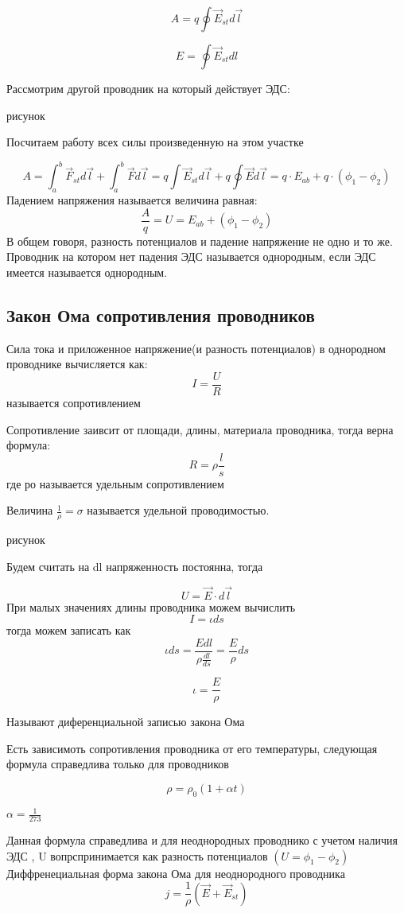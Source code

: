 \documentclass[../main.tex]{subfiles}
\begin{document}
\[A = q \oint \vec E_{st} d \vec l\]

\[E = \oint \vec E_{st} dl\]

Рассмотрим другой проводник на который действует ЭДС:

рисунок

Посчитаем работу всех силы произведенную на этом участке

\[A = \int_{a}^{b} \vec F_{st} d \vec l + \int_{a}^{b} \vec F d \vec l = q \int \vec E_{st} d \vec l + q \oint \vec E d \vec l = q \cdot E_{ab} + q \cdot (\phi_1 - \phi_2)\]
 Падением напряжения называется величина равная:
\[\frac{A}{q} = U = E_{ab} + (\phi_1 - \phi_2)\]
В общем говоря, разность потенциалов и падение напряжение не одно и то же.
Проводник на котором нет падения ЭДС называется однородным, если ЭДС имеется называется однородным.

\subsection{Закон Ома сопротивления проводников}

Сила тока и приложенное напряжение(и разность потенциалов) в однородном проводнике вычисляется как:
\[I = \frac{U}{R}\]
называется сопротивлением

Сопротивление заивсит от площади, длины, материала проводника, тогда верна формула:
\[R = \rho \frac{l}{s}\]
где ро называется удельным сопротивлением

Величина $\frac{1}{\rho} = \sigma$ называется удельной проводимостью.

рисунок

Будем считать на dl напряженность постоянна, тогда

\[U = \vec E \cdot d \vec l\]
При малых значениях длины проводника можем вычислить
\[I = \iota ds\] тогда можем записать как
\[\iota ds = \frac{E dl}{\rho \frac{dl}{ds}} =  \frac{E}{\rho} ds \]

\[\iota = \frac{E}{\rho}\]

Называют диференциальной записью закона Ома

Есть зависимоть сопротивления проводника от его температуры, следующая формула справедлива только для проводников

\[\rho = \rho_0 (1 + \alpha t)\]

$\alpha = \frac{1}{273}$

Данная формула справедлива и для неоднородных проводнико с учетом наличия ЭДС , U вопрспринимается как разность потенциалов $(U = \phi_1 - \phi_2)$
Диффренециальная форма закона Ома для неоднородного проводника
\[j = \frac{1}{\rho}(\vec E + \vec E_{st})\]
\end{document}
